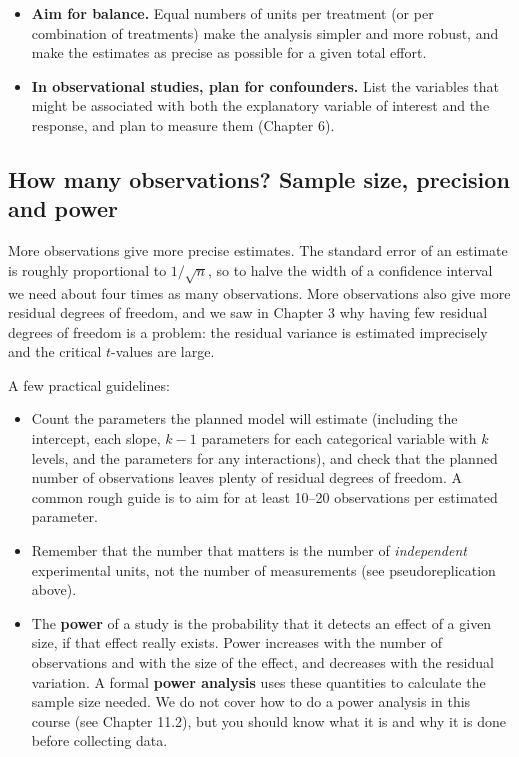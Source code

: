 \documentclass[
  letterpaper,
  8pt,
  a4paper]{book}
\providecommand{\tightlist}{%
  \setlength{\itemsep}{0pt}\setlength{\parskip}{0pt}}
\begin{document}
\begin{itemize}
  \textbf{Block when units differ in known ways.} If experimental units
  differ in a known way (for example, different greenhouse benches, or
  different days), put a full set of treatments in each block, and
  include the block in the model, as a fixed or random effect. This
  removes the variation between blocks from the residual variation and
  makes treatment comparisons more precise.
\item
  \textbf{Aim for balance.} Equal numbers of units per treatment (or per
  combination of treatments) make the analysis simpler and more robust,
  and make the estimates as precise as possible for a given total
  effort.
\item
  \textbf{In observational studies, plan for confounders.} List the
  variables that might be associated with both the explanatory variable
  of interest and the response, and plan to measure them (Chapter 6).
\end{itemize}

\subsection*{How many observations? Sample size, precision and
power}\label{how-many-observations-sample-size-precision-and-power}

More observations give more precise estimates. The standard error of an
estimate is roughly proportional to \(1/\sqrt{n}\), so to halve the
width of a confidence interval we need about four times as many
observations. More observations also give more residual degrees of
freedom, and we saw in Chapter 3 why having few residual degrees of
freedom is a problem: the residual variance is estimated imprecisely and
the critical \(t\)-values are large.

A few practical guidelines:

\begin{itemize}
\tightlist
\item
  Count the parameters the planned model will estimate (including the
  intercept, each slope, \(k-1\) parameters for each categorical
  variable with \(k\) levels, and the parameters for any interactions),
  and check that the planned number of observations leaves plenty of
  residual degrees of freedom. A common rough guide is to aim for at
  least 10--20 observations per estimated parameter.
\item
  Remember that the number that matters is the number of
  \emph{independent} experimental units, not the number of measurements
  (see pseudoreplication above).
\item
  The \textbf{power} of a study is the probability that it detects an
  effect of a given size, if that effect really exists. Power increases
  with the number of observations and with the size of the effect, and
  decreases with the residual variation. A formal \textbf{power
  analysis} uses these quantities to calculate the sample size needed.
  We do not cover how to do a power analysis in this course (see Chapter
  11.2), but you should know what it is and why it is done before
  collecting data.
\end{itemize}
\end{document}
